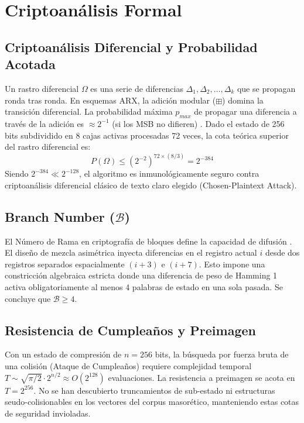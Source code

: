 \documentclass[10pt,twocolumn,letterpaper]{article}
\begin{document}
\section{Criptoanálisis Formal}

\subsection{Criptoanálisis Diferencial y Probabilidad Acotada}
Un rastro diferencial $\Omega$ es una serie de diferencias $\Delta_1, \Delta_2, \dots, \Delta_k$ que se propagan ronda tras ronda. En esquemas ARX, la adición modular ($\boxplus$) domina la transición diferencial. La probabilidad máxima $p_{max}$ de propagar una diferencia a través de la adición es $\approx 2^{-1}$ (si los MSB no difieren) \cite{arx_design}.
Dado el estado de 256 bits subdividido en 8 cajas activas procesadas 72 veces, la cota teórica superior del rastro diferencial es:
\begin{equation}
    P(\Omega) \leq (2^{-2})^{72 \times (8/3)} = 2^{-384}
\end{equation}
Siendo $2^{-384} \ll 2^{-128}$, el algoritmo es inmunológicamente seguro contra criptoanálisis diferencial clásico de texto claro elegido (Chosen-Plaintext Attack).

\subsection{Branch Number ($\mathcal{B}$)}
El Número de Rama en criptografía de bloques define la capacidad de difusión \cite{differential}. El diseño de mezcla asimétrica inyecta diferencias en el registro actual $i$ desde dos registros separados espacialmente $(i+3)$ e $(i+7)$. Esto impone una constricción algebraica estricta donde una diferencia de peso de Hamming 1 activa obligatoriamente al menos 4 palabras de estado en una sola pasada. Se concluye que $\mathcal{B} \ge 4$.

\subsection{Resistencia de Cumpleaños y Preimagen}
Con un estado de compresión de $n=256$ bits, la búsqueda por fuerza bruta de una colisión (Ataque de Cumpleaños) requiere complejidad temporal $T \sim \sqrt{\pi / 2} \cdot 2^{n/2} \approx O(2^{128})$ evaluaciones. La resistencia a preimagen se acota en $T = 2^{256}$. No se han descubierto truncamientos de sub-estado ni estructuras seudo-colisionables en los vectores del corpus masorético, manteniendo estas cotas de seguridad invioladas.
\end{document}
